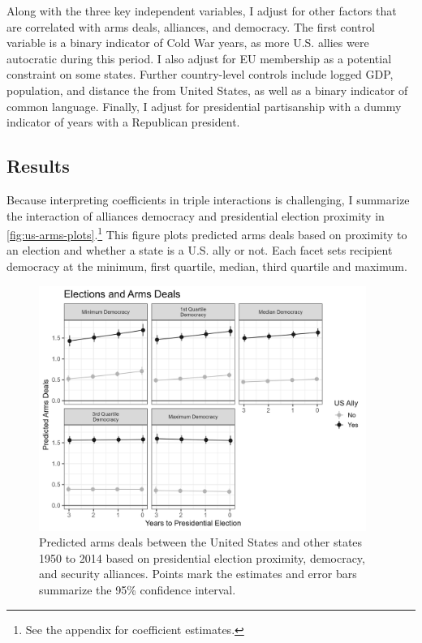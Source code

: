 \documentclass[12pt]{article}
\begin{document}
Along with the three key independent variables, I adjust for other factors that are correlated with arms deals, alliances, and democracy. 
The first control variable is a binary indicator of Cold War years, as more U.S. allies were autocratic during this period. 
I also adjust for EU membership as a potential constraint on some states. 
Further country-level controls include logged GDP, population, and distance the from United States, as well as a binary indicator of common language. 
Finally, I adjust for presidential partisanship with a dummy indicator of years with a Republican president.  



\subsection{Results}


Because interpreting coefficients in triple interactions is challenging, I summarize the interaction of alliances democracy and presidential election proximity in \autoref{fig:us-arms-plots}.\footnote{See the appendix for coefficient estimates.}
This figure plots predicted arms deals based on proximity to an election and whether a state is a U.S. ally or not. 
Each facet sets recipient democracy at the minimum, first quartile, median, third quartile and maximum.


\begin{figure}[htpb]
	\centering
		\includegraphics[width=0.95\textwidth]{../figures/us-arms-plots.png}
	\caption{Predicted arms deals between the United States and other states 1950 to 2014 based on presidential election proximity, democracy, and security alliances. Points mark the estimates and error bars summarize the 95\% confidence interval.}
	\label{fig:us-arms-plots}
\end{figure}
\end{document}
